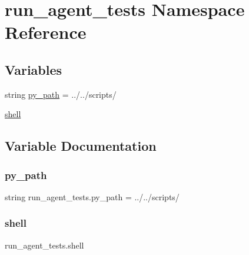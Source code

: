 \hypertarget{namespacerun__agent__tests}{}\section{run\+\_\+agent\+\_\+tests Namespace Reference}
\label{namespacerun__agent__tests}
\subsection*{Variables}
\begin{DoxyCompactItemize}
\item 
string \hyperlink{namespacerun__agent__tests_aa9f8513f6c2b03f52d5587f72458b369}{py\+\_\+path} = \textquotesingle{}../../scripts/\textquotesingle{}
\item 
\hyperlink{namespacerun__agent__tests_a5f5415e4b9990bfa2902ac3f89c5eb0f}{shell}
\end{DoxyCompactItemize}


\subsection{Variable Documentation}
\mbox{\label{namespacerun__agent__tests_aa9f8513f6c2b03f52d5587f72458b369}} 
\subsubsection{\texorpdfstring{py\+\_\+path}{py\_path}}
{\footnotesize\ttfamily string run\+\_\+agent\+\_\+tests.\+py\+\_\+path = \textquotesingle{}../../scripts/\textquotesingle{}}

\mbox{\label{namespacerun__agent__tests_a5f5415e4b9990bfa2902ac3f89c5eb0f}} 
\subsubsection{\texorpdfstring{shell}{shell}}
{\footnotesize\ttfamily run\+\_\+agent\+\_\+tests.\+shell}

